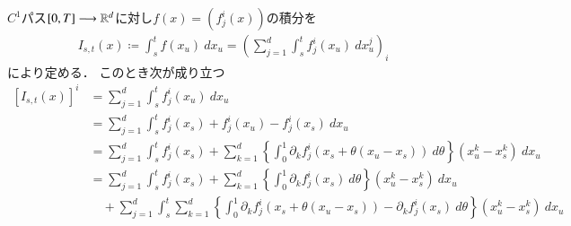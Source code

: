 $C^1$パス$[0,T] \longrightarrow \mathbb{R}^d$に対し$f(x) = (f_j^i(x))$の積分を
\begin{align}
	I_{s,t} (x)
	\coloneqq \int_s^t f(x_u)\ dx_u
	= \left( \sum_{j=1}^d \int_s^t f_j^i(x_u)\ dx^j_u \right)_i
\end{align}
により定める．
このとき次が成り立つ
\begin{align}
	\left[ I_{s,t}(x) \right]^i
	&= \sum_{j=1}^d \int_s^t f_j^i(x_u)\ dx_u \\
	&= \sum_{j=1}^d \int_s^t f_j^i(x_s) + f_j^i(x_u) - f_j^i(x_s)\ dx_u \\
	&= \sum_{j=1}^d \int_s^t f_j^i(x_s) 
		+ \sum_{k=1}^d  \left\{ \int_0^1 \partial_k f_j^i(x_s + \theta(x_u - x_s))\ d\theta \right\} (x^k_u - x^k_s)\ dx_u \\
	&= \sum_{j=1}^d \int_s^t f_j^i(x_s) + \sum_{k=1}^d  \left\{ \int_0^1 \partial_k f_j^i(x_s)\ d\theta \right\} (x^k_u - x^k_s)\ dx_u \\
		&\quad + \sum_{j=1}^d \int_s^t \sum_{k=1}^d  \left\{ \int_0^1 \partial_k f_j^i(x_s + \theta(x_u - x_s)) - \partial_k f_j^i(x_s)\ d\theta \right\} (x^k_u - x^k_s)\ dx_u \\
\end{align}

